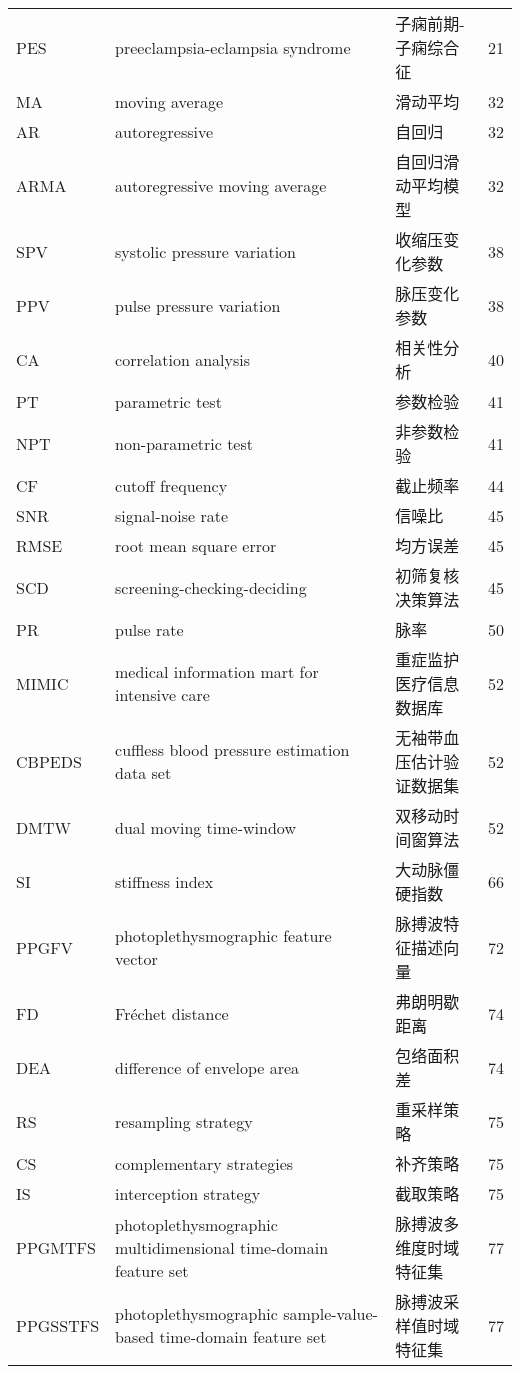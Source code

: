 \begin{center}
\begin{longtable}{m{2cm}m{7cm}m{5cm}m{1cm}<{\centering}}
        PES & preeclampsia-eclampsia syndrome& 子痫前期-子痫综合征& 21 \\
        MA & moving average & 滑动平均& 32 \\
        AR & autoregressive & 自回归& 32\\
        ARMA & autoregressive moving average & 自回归滑动平均模型& 32 \\

        SPV & systolic pressure variation & 收缩压变化参数 & 38 \\
        PPV & pulse pressure variation & 脉压变化参数 & 38 \\
        CA  & correlation analysis & 相关性分析 & 40 \\
        PT  & parametric test & 参数检验 & 41 \\
        NPT & non-parametric test & 非参数检验 & 41 \\
        CF  & cutoff frequency & 截止频率 & 44 \\
        SNR & signal-noise rate & 信噪比 & 45 \\
        RMSE & root mean square error & 均方误差 & 45 \\
        SCD & screening-checking-deciding & 初筛复核决策算法  & 45\\
        PR & pulse rate & 脉率 & 50\\
        MIMIC & medical information mart for intensive care & 重症监护医疗信息数据库 &52\\
        CBPEDS & cuffless blood pressure estimation data set& 无袖带血压估计验证数据集&52\\
        DMTW & dual moving time-window & 双移动时间窗算法& 52 \\
        SI & stiffness index & 大动脉僵硬指数 &66\\


        PPGFV &photoplethysmographic feature vector&  脉搏波特征描述向量 & 72\\
        FD & Fréchet distance & 弗朗明歇距离 & 74 \\
        DEA & difference of envelope area  & 包络面积差& 74 \\
        RS & resampling strategy & 重采样策略 & 75 \\
        CS & complementary strategies & 补齐策略 & 75 \\
        IS & interception strategy & 截取策略 & 75 \\
        PPGMTFS &     photoplethysmographic multidimensional time-domain feature set & 脉搏波多维度时域特征集 & 77 \\
        PPGSSTFS &     photoplethysmographic sample-value-based time-domain feature set & 脉搏波采样值时域特征集 & 77 \\


\end{longtable}
\end{center}
